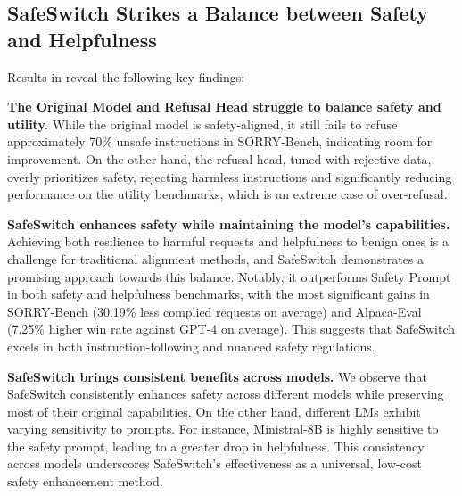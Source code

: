
\subsection{SafeSwitch Strikes a Balance between Safety and Helpfulness}
\label{sec:steer_results}

Results in  reveal the following key findings:

\textbf{The Original Model and Refusal Head struggle to balance safety and utility.} While the original model is safety-aligned, it still fails to refuse approximately 70\% unsafe instructions in SORRY-Bench, indicating room for improvement. On the other hand, the refusal head, tuned with rejective data, overly prioritizes safety, rejecting harmless instructions and significantly reducing performance on the utility benchmarks, which is an extreme case of over-refusal.

\textbf{SafeSwitch enhances safety while maintaining the model’s capabilities.} Achieving both resilience to harmful requests and helpfulness to benign ones is a challenge for traditional alignment methods, and SafeSwitch demonstrates a promising approach towards this balance. Notably, it outperforms Safety Prompt in both safety and helpfulness benchmarks, with the most significant gains in SORRY-Bench (30.19\% less complied requests on average) and Alpaca-Eval (7.25\% higher win rate against GPT-4 on average). This suggests that SafeSwitch excels in both instruction-following and nuanced safety regulations.

\textbf{SafeSwitch brings consistent benefits across models.} We observe that SafeSwitch consistently enhances safety across different models while preserving most of their original capabilities. On the other hand, different LMs exhibit varying sensitivity to prompts. For instance, Ministral-8B is highly sensitive to the safety prompt, leading to a greater drop in helpfulness. This consistency across models underscores SafeSwitch’s effectiveness as a universal, low-cost safety enhancement method.




